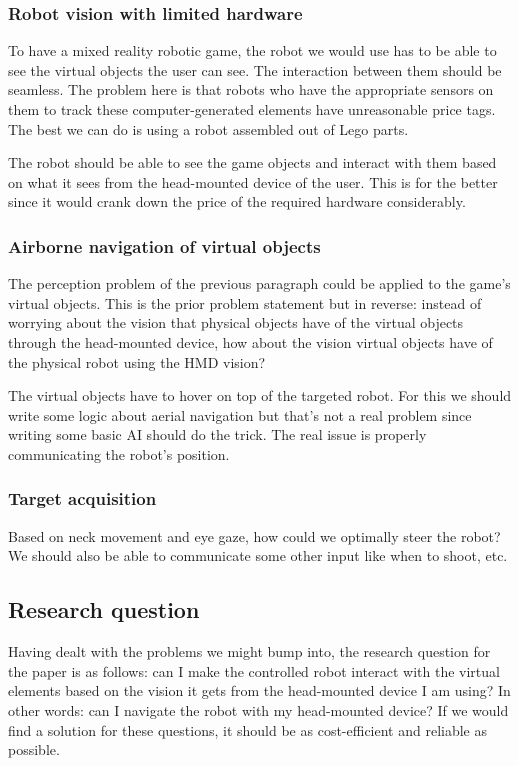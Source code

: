\documentclass{article}
\begin{document}
\subsubsection{Robot vision with limited hardware}
To have a mixed reality robotic game, the robot we would use has to be able to see the virtual objects the user can see. The interaction between them should be seamless. The problem here is that robots who have the appropriate sensors on them to track these computer-generated elements have unreasonable price tags. The best we can do is using a robot assembled out of Lego parts. 

The robot should be able to see the game objects and interact with them based on what it sees from the head-mounted device of the user. This is for the better since it would crank down the price of the required hardware considerably.

\subsubsection{Airborne navigation of virtual objects}
The perception problem of the previous paragraph could be applied to the game's virtual objects. This is the prior problem statement but in reverse: instead of worrying about the vision that physical objects have of the virtual objects through the head-mounted device, how about the vision virtual objects have of the physical robot using the HMD vision? 

The virtual objects have to hover on top of the targeted robot. For this we should write some logic about aerial navigation but that's not a real problem since writing some basic AI should do the trick. The real issue is properly communicating the robot's position. 

\subsubsection{Target acquisition}
Based on neck movement and eye gaze, how could we optimally steer the robot? We should also be able to communicate some other input like when to shoot, etc.

\subsection{Research question}
Having dealt with the problems we might bump into, the research question for the paper is as follows: can I make the controlled robot interact with the virtual elements based on the vision it gets from the head-mounted device I am using? In other words: can I navigate the robot with my head-mounted device?
If we would find a solution for these questions, it should be as cost-efficient and reliable as possible. 
\end{document}
